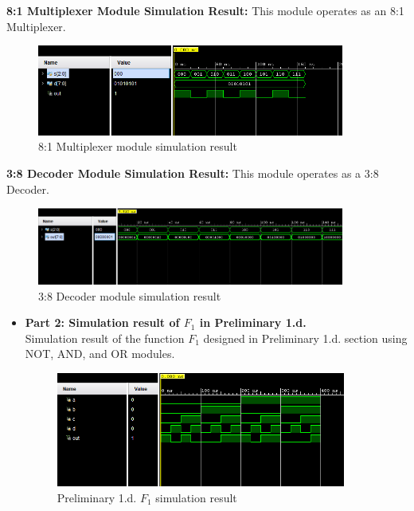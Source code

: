 \documentclass[pdftex,12pt,a4paper]{article}
\begin{document}
\begin{itemize}
   \textbf{8:1 Multiplexer Module Simulation Result:} This module operates as an 8:1 Multiplexer.
    \begin{figure}[H]
    \centering
        \includegraphics[width=0.9\textwidth]{MUX.png}	
        \caption{8:1 Multiplexer module simulation result}
        \label{fig1}
   \end{figure}
\newpage
   \textbf{3:8 Decoder Module Simulation Result:} This module operates as a 3:8 Decoder.
    \begin{figure}[H]
    \centering
        \includegraphics[width=0.9\textwidth]{Decoder.png}	
        \caption{3:8 Decoder module simulation result}
        \label{fig1}
   \end{figure}
\end{itemize}
\begin{itemize}
    \item \textbf{Part 2: Simulation result of $F_1$ in Preliminary 1.d.}\\
    Simulation result of the function $F_1$ designed in Preliminary 1.d. section using NOT, AND, and OR modules.
    \begin{figure}[H]
    \centering
        \includegraphics[width=0.9\textwidth]{1d.png}	
        \caption{Preliminary 1.d. $F_1$ simulation result}
        \label{fig1}
   \end{figure}
\end{itemize}
\end{document}
